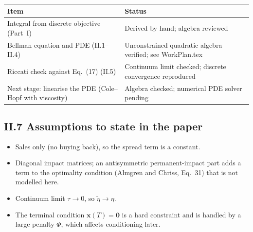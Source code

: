 \documentclass[11pt,a4paper]{article}
\begin{document}
\begin{center}
\begin{tabular}{@{}L{5.2cm}L{8.6cm}@{}}
\toprule
\textbf{Item} & \textbf{Status} \\
\midrule
Integral from discrete objective (Part~I) & Derived by hand; algebra reviewed \\
Bellman equation and PDE (II.1--II.4) & Unconstrained quadratic algebra verified; see WorkPlan.tex \\
Riccati check against Eq.~(17) (II.5) & Continuum limit checked; discrete convergence reproduced \\
Next stage: linearise the PDE (Cole--Hopf with viscosity) & Algebra checked; numerical PDE solver pending \\
\bottomrule
\end{tabular}
\end{center}

\subsection*{II.7 Assumptions to state in the paper}

\begin{itemize}[leftmargin=1.5em]
  \item Sales only (no buying back), so the spread term is a constant.
  \item Diagonal impact matrices; an antisymmetric permanent-impact part adds a term
        to the optimality condition (Almgren and Chriss, Eq.~31) that is not
        modelled here.
  \item Continuum limit $\tau\to0$, so $\tilde\eta\to\eta$.
  \item The terminal condition $\mathbf{x}(T)=\mathbf{0}$ is a hard constraint and
        is handled by a large penalty $\Phi$, which affects conditioning later.
\end{itemize}
\end{document}
